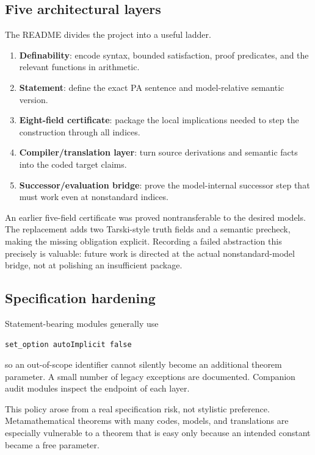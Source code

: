 \documentclass[
  10pt,
  a4paper,
  twoside,
  open=any,
  parskip=half,
  headings=big
]{scrreprt}
\begin{document}
\subsection{Five architectural layers}

The README divides the project into a useful ladder.

\begin{enumerate}
  \item \textbf{Definability}: encode syntax, bounded satisfaction, proof
        predicates, and the relevant functions in arithmetic.
  \item \textbf{Statement}: define the exact PA sentence and model-relative
        semantic version.
  \item \textbf{Eight-field certificate}: package the local implications
        needed to step the construction through all indices.
  \item \textbf{Compiler/translation layer}: turn source derivations and
        semantic facts into the coded target claims.
  \item \textbf{Successor/evaluation bridge}: prove the model-internal
        successor step that must work even at nonstandard indices.
\end{enumerate}

An earlier five-field certificate was proved nontransferable to the desired
models.  The replacement adds two Tarski-style truth fields and a semantic
precheck, making the missing obligation explicit.  Recording a failed
abstraction this precisely is valuable: future work is directed at the actual
nonstandard-model bridge, not at polishing an insufficient package.

\subsection{Specification hardening}

Statement-bearing modules generally use

\begin{lstlisting}[language=Lean]
set_option autoImplicit false
\end{lstlisting}

so an out-of-scope identifier cannot silently become an additional theorem
parameter.  A small number of legacy exceptions are documented.  Companion
audit modules inspect the endpoint of each layer.

This policy arose from a real specification risk, not stylistic preference.
Metamathematical theorems with many codes, models, and translations are
especially vulnerable to a theorem that is easy only because an intended
constant became a free parameter.
\end{document}
